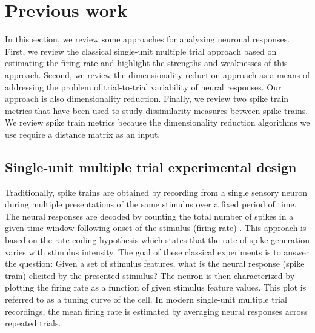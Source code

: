 
\section{Previous work}
In this section, we review some approaches for analyzing neuronal responses.
First, we review the classical single-unit multiple trial approach based 
on estimating the firing rate and highlight the strengths
and weaknesses of this approach. Second, we review the dimensionality
reduction approach as a means of addressing the problem of trial-to-trial variability of neural responses. Our approach is also dimensionality reduction. Finally, we review two spike train metrics that have been used to study dissimilarity measures between spike trains. 
We review spike train metrics because the dimensionality reduction algorithms we use require a distance matrix as an input.


\subsection{Single-unit multiple trial experimental design}
Traditionally, spike trains are obtained by recording from a single sensory neuron during multiple presentations of the same stimulus over a fixed period of time. The neural responses are decoded by counting the total number of spikes in a given time window following onset of the stimulus (firing rate) \cite{Abbott2001}.
This approach is based on the rate-coding hypothesis which states that the rate of spike generation varies with stimulus intensity.
The goal of these classical experiments is to answer the question:
Given a set of stimulus features, what is the neural response (spike train) elicited by the presented stimulus? The neuron is then characterized by plotting the firing rate as a function of given stimulus feature values. This plot is referred to as a tuning curve of the cell.
In modern single-unit multiple trial recordings, the mean firing rate is estimated by averaging neural responses across repeated trials.


